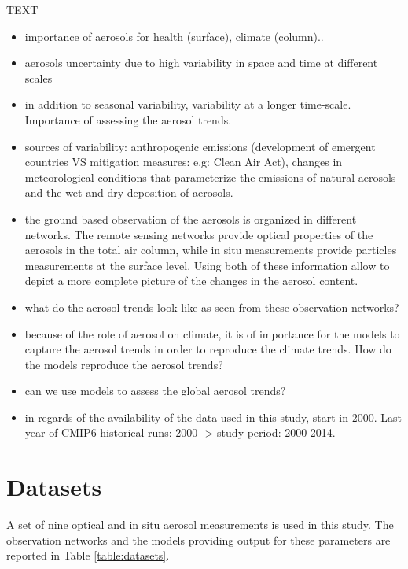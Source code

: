 \documentclass[journal abbreviation, manuscript]{copernicus}
\begin{document}
\introduction  %
TEXT
\begin{itemize}
 \item importance of aerosols for health (surface), climate (column)..
 \item aerosols uncertainty due to high variability in space and time at different scales
 \item in addition to seasonal variability, variability at a longer time-scale. Importance of assessing the aerosol trends.
 \item sources of variability: anthropogenic emissions (development of emergent countries VS mitigation measures: e.g: Clean Air Act), changes in meteorological conditions that parameterize the emissions of natural aerosols and the wet and dry deposition of aerosols.
 \item the ground based observation of the aerosols is organized in different networks. The remote sensing networks provide optical properties of the aerosols in the total air column, while in situ measurements provide particles measurements at the surface level. Using both of these information allow to depict a more complete picture of the changes in the aerosol content.
 \item what do the aerosol trends look like as seen from these observation networks?
 \item because of the role of aerosol on climate, it is of importance for the models to capture the aerosol trends in order to reproduce the climate trends. How do the models reproduce the aerosol trends?
 \item can we use models to assess the global aerosol trends?
 \item in regards of the availability of the data used in this study, start in 2000. Last year of CMIP6 historical runs: 2000 -> study period: 2000-2014.
\end{itemize}


\section{Datasets}
A set of nine optical and in situ aerosol measurements is used in this study. The observation networks and the models providing output for these parameters are reported in Table \ref{table:datasets}.
\end{document}
